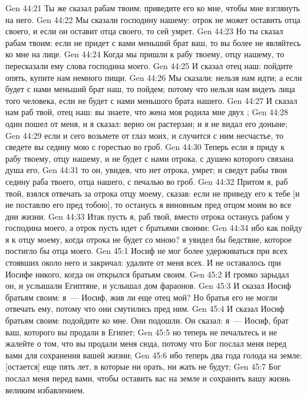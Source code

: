 \vs Gen 44:21 Ты же сказал рабам твоим: приведите его ко мне, чтобы мне взглянуть на него.
\vs Gen 44:22 Мы сказали господину нашему: отрок не может оставить отца своего, и если он оставит отца своего, то сей умрет.
\vs Gen 44:23 Но ты сказал рабам твоим: если не придет с вами меньший брат ваш, то вы более не являйтесь ко мне на лице.
\vs Gen 44:24 Когда мы пришли к рабу твоему, отцу нашему, то пересказали ему слова господина моего.
\vs Gen 44:25 И сказал отец наш: пойдите опять, купите нам немного пищи.
\vs Gen 44:26 Мы сказали: нельзя нам идти; а если будет с нами меньший брат наш, то пойдем; потому что нельзя нам видеть лица того человека, если не будет с нами меньшого брата нашего.
\vs Gen 44:27 И сказал нам раб твой, отец наш: вы знаете, что жена моя родила мне двух ;
\vs Gen 44:28 один пошел от меня, и я сказал: верно он растерзан; и я не видал его доныне;
\vs Gen 44:29 если и сего возьмете от глаз моих, и случится с ним несчастье, то сведете вы седину мою с горестью во гроб.
\vs Gen 44:30 Теперь если я приду к рабу твоему, отцу нашему, и не будет с нами отрока, с душею которого связана душа его,
\vs Gen 44:31 то он, увидев, что нет отрока, умрет; и сведут рабы твои седину раба твоего, отца нашего, с печалью во гроб.
\vs Gen 44:32 Притом я, раб твой, взялся отвечать за отрока отцу моему, сказав: если не приведу его к тебе [и не поставлю его пред тобою], то останусь я виновным пред отцом моим во все дни жизни.
\vs Gen 44:33 Итак пусть я, раб твой, вместо отрока останусь рабом у господина моего, а отрок пусть идет с братьями своими:
\vs Gen 44:34 ибо как пойду я к отцу моему, когда отрока не будет со мною? я увидел бы бедствие, которое постигло бы отца моего.
\vs Gen 45:1 Иосиф не мог более удерживаться при всех стоявших около него и закричал: удалите от меня всех. И не оставалось при Иосифе никого, когда он открылся братьям своим.
\vs Gen 45:2 И громко зарыдал он, и услышали Египтяне, и услышал дом фараонов.
\vs Gen 45:3 И сказал Иосиф братьям своим: я~--- Иосиф, жив ли еще отец мой? Но братья его не могли отвечать ему, потому что они смутились пред ним.
\vs Gen 45:4 И сказал Иосиф братьям своим: подойдите ко мне. Они подошли. Он сказал: я~--- Иосиф, брат ваш, которого вы продали в Египет;
\vs Gen 45:5 но теперь не печальтесь и не жалейте о том, что вы продали меня сюда, потому что Бог послал меня перед вами для сохранения вашей жизни;
\vs Gen 45:6 ибо теперь два года голода на земле: [остается] еще пять лет, в которые ни орать, ни жать не будут;
\vs Gen 45:7 Бог послал меня перед вами, чтобы оставить вас на земле и сохранить вашу жизнь великим избавлением.
